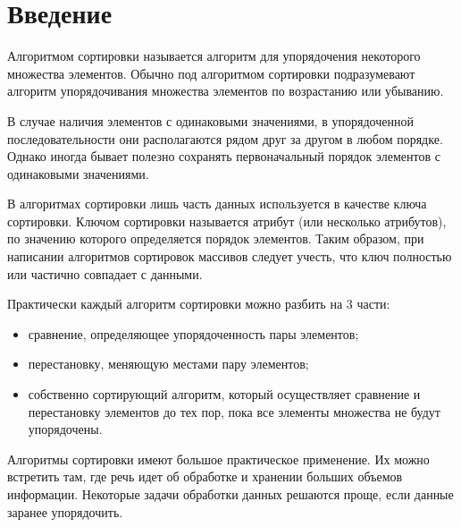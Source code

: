 \documentclass{article}
\begin{document}
\section{Введение}

\par Алгоритмом сортировки называется алгоритм для упорядочения некоторого множества элементов. Обычно под алгоритмом сортировки подразумевают алгоритм упорядочивания множества элементов по возрастанию или убыванию.

В случае наличия элементов с одинаковыми значениями, в упорядоченной последовательности они располагаются рядом друг за другом в любом порядке. Однако иногда бывает полезно сохранять первоначальный порядок элементов с одинаковыми значениями.

В алгоритмах сортировки лишь часть данных используется в качестве ключа сортировки. Ключом сортировки называется атрибут (или несколько атрибутов), по значению которого определяется порядок элементов. Таким образом, при написании алгоритмов сортировок массивов следует учесть, что ключ полностью или частично совпадает с данными.

Практически каждый алгоритм сортировки можно разбить на 3 части:
\begin{itemize}
\item сравнение, определяющее упорядоченность пары элементов;

\item перестановку, меняющую местами пару элементов;
\item собственно сортирующий алгоритм, который осуществляет сравнение и перестановку элементов до тех пор, пока все элементы множества не будут упорядочены.
\end{itemize}
Алгоритмы сортировки имеют большое практическое применение. Их можно встретить там, где речь идет об обработке и хранении больших объемов информации. Некоторые задачи обработки данных решаются проще, если данные заранее упорядочить.
\end{document}
